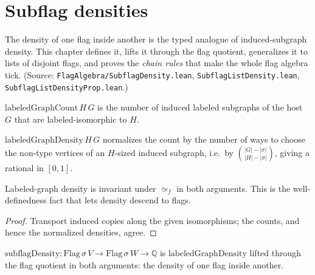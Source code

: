 \chapter{Subflag densities}
\label{chap:density}

The density of one flag inside another is the typed analogue of induced-subgraph
density. This chapter defines it, lifts it through the flag quotient, generalizes
it to lists of disjoint flags, and proves the \emph{chain rules} that make the
whole flag algebra tick. (Source: \texttt{FlagAlgebra/SubflagDensity.lean},
\texttt{SubflagListDensity.lean}, \texttt{SubflagListDensityProp.lean}.)

\begin{definition}
  \label{def:labeled-graph-count}
  \leanok
  $\mathrm{labeledGraphCount}\,H\,G$ is the number of induced labeled subgraphs
  of the host $G$ that are labeled-isomorphic to $H$.
\end{definition}

\begin{definition}
  \label{def:labeled-graph-density}
  \leanok
  $\mathrm{labeledGraphDensity}\,H\,G$ normalizes the count by the number of ways
  to choose the non-type vertices of an $H$-sized induced subgraph, i.e.\ by
  $\binom{|G|-|\sigma|}{|H|-|\sigma|}$, giving a rational in $[0,1]$.
\end{definition}

\begin{lemma}
  \label{lem:density-iso-invariant}
  \leanok
  Labeled-graph density is invariant under $\simeq_f$ in both arguments. This is
  the well-definedness fact that lets density descend to flags.
\end{lemma}
\begin{proof}\leanok
  Transport induced copies along the given isomorphisms; the counts, and hence
  the normalized densities, agree.
\end{proof}

\begin{definition}
  \label{def:subflag-density}
  \leanok
  $\mathrm{subflagDensity} : \mathrm{Flag}\,\sigma\,V \to \mathrm{Flag}\,\sigma\,W
  \to \mathbb{Q}$ is $\mathrm{labeledGraphDensity}$ lifted through the flag
  quotient in both arguments: the density of one flag inside another.
\end{definition}

